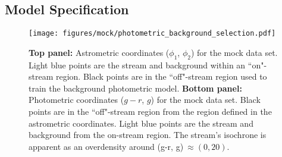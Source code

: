 \documentclass[twocolumn]{aastex631}
\begin{document}
    \subsection{Model Specification} \label{sub:results_mock:model}

        \begin{figure}
            \centering
            \texttt{[image: figures/mock/photometric\_background\_selection.pdf]}
            \caption{
                \textbf{Top panel:} Astrometric coordinates ($\phi_1$, $\phi_2$)
                for the mock data set.  Light blue points are the stream and
                background within an ``on"-stream region. Black points are in
                the ``off"-stream region used to train the background
                photometric model.
                \textbf{Bottom panel:} Photometric coordinates ($g-r$, $g$) for
                the mock data set.  Black points are in the ``off"-stream region
                from the region defined in the astrometric coordinates.  Light
                blue points are the stream and background from the on-stream
                region. The stream's isochrone is apparent as an overdensity
                around (g-r, g)$\ \approx (0, 20)$.
            }
            \label{fig:mock_data_photometric_background_selection}
        \end{figure}
\end{document}
